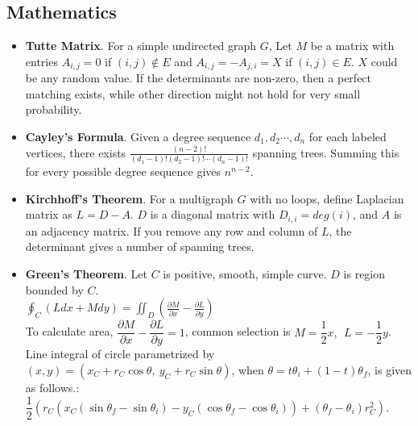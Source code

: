 \documentclass[landscape, 8pt, a4paper, oneside, twocolumn]{extarticle}
\begin{document}
\subsection {Mathematics}
\begin{itemize}
	\item \textbf{Tutte Matrix}. For a simple undirected graph $G$, Let $M$ be a matrix with entries $A_{i, j} = 0$ if $(i, j) \notin E$ and $A_{i, j} = -A_{j, i} = X$ if $(i, j) \in E$. $X$ could be any random value. If the determinants are non-zero, then a perfect matching exists, while other direction might not hold for very small probability.
	\item \textbf{Cayley's Formula}. Given a degree sequence $d_1, d_2 \cdots, d_n$ for each labeled vertices, there exists $\frac{(n-2)!}{(d_1 - 1)!(d_2 - 1)! \cdots (d_n - 1)!}$ spanning trees. Summing this for every possible degree sequence gives $n^{n-2}$. 
	\item \textbf{Kirchhoff's Theorem}. For a multigraph $G$ with no loops, define Laplacian matrix as $L = D - A$. $D$ is a diagonal matrix with $D_{i, i} = deg(i)$, and $A$ is an adjacency matrix. If you remove any row and column of $L$, the determinant gives a number of spanning trees.
	\item \textbf{Green's Theorem}. Let $C$ is positive, smooth, simple curve. $D$ is region bounded by $C$. \\
	{
    	\large
    	$\oint_C (L dx + M dy)  = \iint_D (\frac{\partial M}{\partial x} - \frac{\partial L}{\partial y}) $ 
    }\\
    
    To calculate area, $\dfrac{\partial M}{\partial x} - \dfrac{\partial L}{\partial y} = 1$, common selection is $M = \dfrac{1}{2} x, \ \ L = -\dfrac{1}{2} y$. \\
    
    Line integral of circle parametrized by $(x, y) = (x_C + r_C \cos \theta, \ y_C + r_C \sin \theta)$, when $\theta = t \theta_i + (1 - t) \theta_f$, is given as follows.:  $\dfrac{1}{2}( r_C (x_C (\sin \theta_f - \sin \theta_i) - y_C (\cos \theta_f - \cos \theta_i) ) + (\theta_f - \theta_i) r_C ^ 2)$.  \\
    

\end{itemize}
\end{document}
